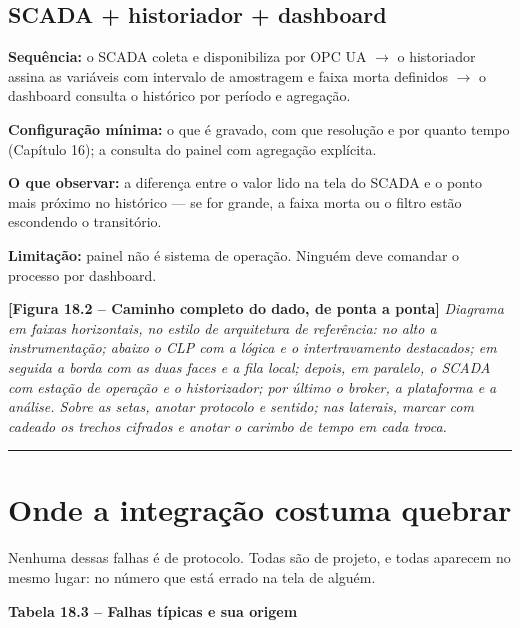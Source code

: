 \subsection{SCADA + historiador + dashboard}\label{scada-historiador-dashboard}

\textbf{Sequência:} o SCADA coleta e disponibiliza por OPC UA \ensuremath{\rightarrow} o historiador assina as variáveis com
intervalo de amostragem e faixa morta definidos \ensuremath{\rightarrow} o dashboard consulta o histórico por período e
agregação.

\textbf{Configuração mínima:} o que é gravado, com que resolução e por quanto tempo (Capítulo 16); a
consulta do painel com agregação explícita.

\textbf{O que observar:} a diferença entre o valor lido na tela do SCADA e o ponto mais próximo no
histórico --- se for grande, a faixa morta ou o filtro estão escondendo o transitório.

\textbf{Limitação:} painel não é sistema de operação. Ninguém deve comandar o processo por dashboard.

\begin{caixafigura}

\textbf{{[}Figura 18.2 -- Caminho completo do dado, de ponta a ponta{]}}
\emph{Diagrama em faixas horizontais, no estilo de arquitetura de referência: no alto a instrumentação; abaixo o CLP com a lógica e o intertravamento destacados; em seguida a borda com as duas faces e a fila local; depois, em paralelo, o SCADA com estação de operação e o historizador; por último o broker, a plataforma e a análise. Sobre as setas, anotar protocolo e sentido; nas laterais, marcar com cadeado os trechos cifrados e anotar o carimbo de tempo em cada troca.}

\end{caixafigura}

\begin{center}\rule{0.5\linewidth}{0.5pt}\end{center}

\section{Onde a integração costuma quebrar}\label{onde-a-integrauxe7uxe3o-costuma-quebrar}

Nenhuma dessas falhas é de protocolo. Todas são de projeto, e todas aparecem no mesmo lugar: no
número que está errado na tela de alguém.

\textbf{Tabela 18.3 -- Falhas típicas e sua origem}

